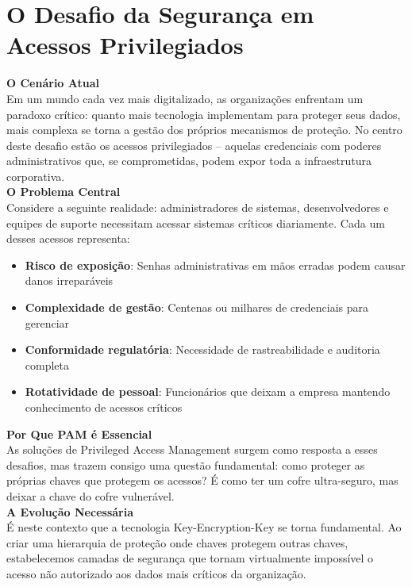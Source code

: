 \section{O Desafio da Segurança em Acessos Privilegiados}

\textbf{\large O Cenário Atual}\\

Em um mundo cada vez mais digitalizado, as organizações enfrentam um paradoxo crítico: quanto mais tecnologia implementam para proteger seus dados, mais complexa se torna a gestão dos próprios mecanismos de proteção. No centro deste desafio estão os acessos privilegiados – aquelas credenciais com poderes administrativos que, se comprometidas, podem expor toda a infraestrutura corporativa.\\

\textbf{\large O Problema Central}\\

Considere a seguinte realidade: administradores de sistemas, desenvolvedores e equipes de suporte necessitam acessar sistemas críticos diariamente. Cada um desses acessos representa:

\begin{itemize}
  \item \textbf{Risco de exposição}: Senhas administrativas em mãos erradas podem causar danos irreparáveis
  \item \textbf{Complexidade de gestão}: Centenas ou milhares de credenciais para gerenciar
  \item \textbf{Conformidade regulatória}: Necessidade de rastreabilidade e auditoria completa
  \item \textbf{Rotatividade de pessoal}: Funcionários que deixam a empresa mantendo conhecimento de acessos críticos
\end{itemize}

\textbf{\large Por Que PAM é Essencial}\\

As soluções de Privileged Access Management surgem como resposta a esses desafios, mas trazem consigo uma questão fundamental: como proteger as próprias chaves que protegem os acessos? É como ter um cofre ultra-seguro, mas deixar a chave do cofre vulnerável.\\

\textbf{\large A Evolução Necessária}\\

É neste contexto que a tecnologia Key-Encryption-Key se torna fundamental. Ao criar uma hierarquia de proteção onde chaves protegem outras chaves, estabelecemos camadas de segurança que tornam virtualmente impossível o acesso não autorizado aos dados mais críticos da organização.\\

\pagebreak
